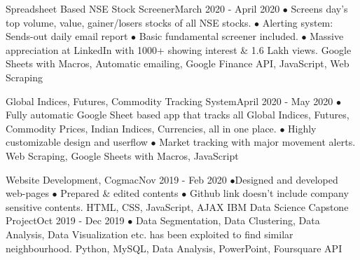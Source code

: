 \vspace{-4ex}
\begin{projects}
     
    \project
    {Spreadsheet Based NSE Stock Screener}{March 2020 - April 2020}
    {}
    {$\bullet$ Screens day's top volume, value, gainer/losers stocks of all NSE stocks. $\bullet$ Alerting system: Sends-out daily email report $\bullet$ Basic fundamental screener included. $\bullet$ Massive appreciation at LinkedIn with 1000+ showing interest \& 1.6 Lakh views.}
    {Google Sheets with Macros, Automatic emailing, Google Finance API, JavaScript, Web Scraping}
\end{projects}
\vspace{-4ex}
\begin{projects}   
    
    \project
    {Global Indices, Futures, Commodity Tracking System}{April 2020 - May 2020}
    {}
    {$\bullet$ Fully automatic Google Sheet based app that tracks all Global Indices, Futures, Commodity Prices, Indian Indices, Currencies, all in one place. $\bullet$ Highly customizable design and userflow $\bullet$ Market tracking with major movement alerts.}
    {Web Scraping, Google Sheets with Macros, JavaScript}
\end{projects}
\vspace{-4ex}
\begin{projects}    
   \project   
    {Website Development, Cogmac}{Nov 2019 - Feb 2020}
    { }
    {$\bullet$Designed and developed web-pages $\bullet$ Prepared \& edited contents $\bullet$ Github link doesn't include company sensitive contents.}
    {HTML, CSS, JavaScript, AJAX}
    \project
    {IBM Data Science Capstone Project}{Oct 2019 - Dec 2019}
    {  }
    {$\bullet$ Data Segmentation, Data Clustering, Data Analysis, Data Visualization etc. has been exploited to find similar neighbourhood.}
    {Python, MySQL, Data Analysis, PowerPoint, Foursquare API}
\end{projects}
\vspace{-4ex}
